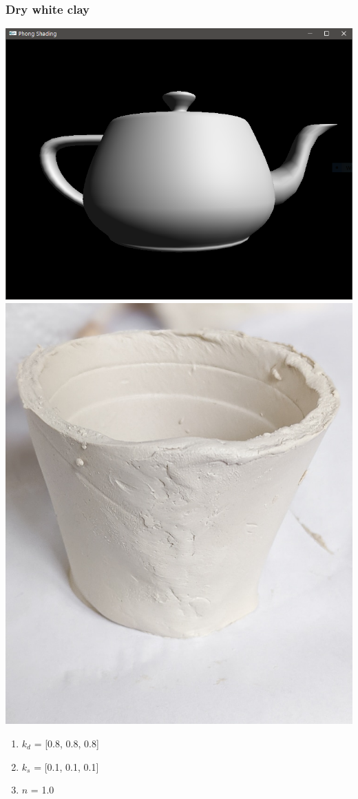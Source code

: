 \documentclass{beamer}
\begin{document}
\begin{frame}
    \frametitle{Dry white clay}

    \begin{center}
        \includegraphics[scale=0.15]{q5-white-clay.png}
        \includegraphics[scale=0.1]{white-clay.jpg}
    \end{center}

    \begin{enumerate}
        \item $k_d$ = [0.8, 0.8, 0.8]
        \item $k_s$ = [0.1, 0.1, 0.1]
        \item $n$ = 1.0
    \end{enumerate}

\end{frame}
\end{document}
